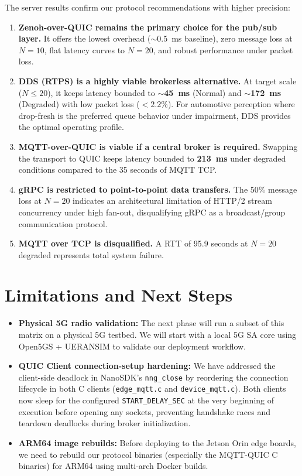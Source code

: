 \documentclass[11pt,a4paper]{article}
\begin{document}
The server results confirm our protocol recommendations with higher precision:
\begin{enumerate}
    \item \textbf{Zenoh-over-QUIC remains the primary choice for the pub/sub layer.} It offers the lowest overhead ($\sim$0.5~ms baseline), zero message loss at $N=10$, flat latency curves to $N=20$, and robust performance under packet loss.
    \item \textbf{DDS (RTPS) is a highly viable brokerless alternative.} At target scale ($N \le 20$), it keeps latency bounded to \textbf{$\sim$45~ms} (Normal) and \textbf{$\sim$172~ms} (Degraded) with low packet loss ($<2.2\%$). For automotive perception where drop-fresh is the preferred queue behavior under impairment, DDS provides the optimal operating profile.
    \item \textbf{MQTT-over-QUIC is viable if a central broker is required.} Swapping the transport to QUIC keeps latency bounded to \textbf{213~ms} under degraded conditions compared to the 35 seconds of MQTT TCP.
    \item \textbf{gRPC is restricted to point-to-point data transfers.} The 50\% message loss at $N=20$ indicates an architectural limitation of HTTP/2 stream concurrency under high fan-out, disqualifying gRPC as a broadcast/group communication protocol.
    \item \textbf{MQTT over TCP is disqualified.} A RTT of 95.9 seconds at $N=20$ degraded represents total system failure.
\end{enumerate}

\section{Limitations and Next Steps}

\begin{itemize}
    \item \textbf{Physical 5G radio validation:} The next phase will run a subset of this matrix on a physical 5G testbed. We will start with a local 5G SA core using Open5GS + UERANSIM to validate our deployment workflow.
    \item \textbf{QUIC Client connection-setup hardening:} We have addressed the client-side deadlock in NanoSDK's \texttt{nng\_close} by reordering the connection lifecycle in both C clients (\texttt{edge\_mqtt.c} and \texttt{device\_mqtt.c}). Both clients now sleep for the configured \texttt{START\_DELAY\_SEC} at the very beginning of execution before opening any sockets, preventing handshake races and teardown deadlocks during broker initialization.
    \item \textbf{ARM64 image rebuilds:} Before deploying to the Jetson Orin edge boards, we need to rebuild our protocol binaries (especially the MQTT-QUIC C binaries) for ARM64 using multi-arch Docker builds.
\end{itemize}
\end{document}

